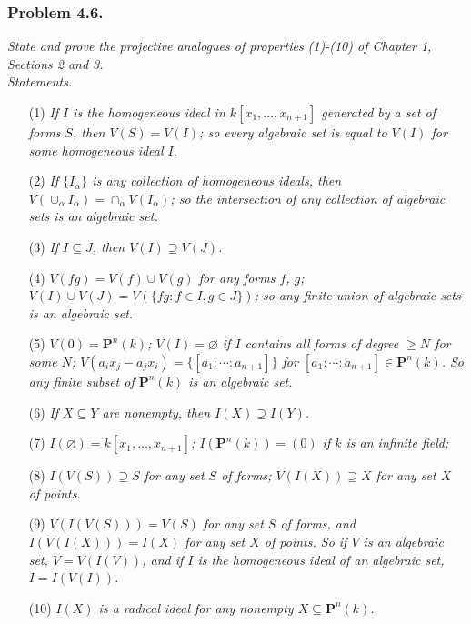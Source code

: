 \documentclass{article}
\begin{document}



\subsubsection*{Problem 4.6.}
\emph{State and prove the projective analogues of properties (1)-(10) of Chapter 1,
Sections 2 and 3.} \\

\emph{Statements.}
\begin{enumerate}
\item[(1)]
  \emph{If $I$ is the homogeneous ideal in $k[x_1, \ldots, x_{n+1}]$ generated by a set of forms $S$,
  then $V(S) = V(I)$; so every algebraic set is equal to $V(I)$ for some homogeneous ideal $I$.}

\item[(2)]
  \emph{If $\{ I_\alpha \}$ is any collection of homogeneous ideals,
  then $V(\cup_{\alpha} I_\alpha) = \cap_{\alpha} V(I_\alpha)$;
  so the intersection of any collection of algebraic sets is an algebraic set.}

\item[(3)]
  \emph{If $I \subseteq J$, then $V(I) \supseteq V(J)$.}

\item[(4)]
  \emph{$V(fg) = V(f) \cup V(g)$ for any forms $f$, $g$;
  $V(I) \cup V(J) = V(\{ fg : f \in I, g \in J \})$;
  so any finite union of algebraic sets is an algebraic set.}

\item[(5)]
  \emph{$V(0) = \mathbf{P}^{n}(k)$;
  $V(I) = \varnothing$ if $I$ contains all forms of degree $\geq N$ for some $N$;
  $V(a_i x_j - a_j x_i) = \{ [a_1 : \cdots : a_{n+1}] \}$
  for $[a_1 : \cdots : a_{n+1}] \in \mathbf{P}^{n}(k)$.
  So any finite subset of $\mathbf{P}^{n}(k)$ is an algebraic set.}

\item[(6)]
  \emph{If $X \subseteq Y$ are nonempty, then $I(X) \supseteq I(Y)$.}

\item[(7)]
  \emph{$I(\varnothing) = k[x_1, \ldots, x_{n+1}]$;
  $I(\mathbf{P}^{n}(k)) = (0)$ if $k$ is an infinite field;}

\item[(8)]
  \emph{$I(V(S)) \supseteq S$ for any set $S$ of forms;
  $V(I(X)) \supseteq X$ for any set $X$ of points.}

\item[(9)]
  \emph{$V(I(V(S))) = V(S)$ for any set $S$ of forms,
  and $I(V(I(X))) = I(X)$ for any set $X$ of points.
  So if $V$ is an algebraic set, $V = V(I(V))$,
  and if $I$ is the homogeneous ideal of an algebraic set, $I = I(V(I))$.}

\item[(10)]
  \emph{$I(X)$ is a radical ideal for any nonempty $X \subseteq \mathbf{P}^{n}(k)$.} \\
\end{enumerate}
\end{document}
